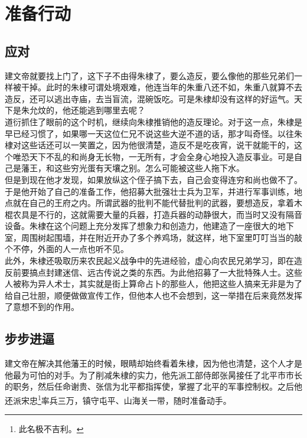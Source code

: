 \section{准备行动}
\ifnum{}
	\begin{multicols}{\theparacolNo}
\fi
\subsection{应对}
建文帝就要找上门了，这下子不由得朱棣了，要么造反，要么像他的那些兄弟们一样被干掉。此时的朱棣可谓处境艰难，他连当年的朱重八还不如，朱重八就算不去造反，还可以逃出寺庙，去当盲流，混碗饭吃。可是朱棣却没有这样的好运气。天下是朱允炆的，他还能逃到哪里去呢？\\

道衍抓住了眼前的这个时机，继续向朱棣推销他的造反理论。对于这一点，朱棣是早已经习惯了，如果哪一天这位仁兄不说这些大逆不道的话，那才叫奇怪。以往朱棣对这些话还可以一笑置之，因为他很清楚，造反不是吃夜宵，说干就能干的，这个唯恐天下不乱的和尚身无长物，一无所有，才会全身心地投入造反事业。可是自己是藩王，和这些穷光蛋有天壤之别。怎么可能被这些人拖下水。\\

但是到现在他才发现，如果放纵这个侄子搞下去，自己会变得连穷和尚也做不了。\\

于是他开始了自己的准备工作，他招募大批强壮士兵为卫军，并进行军事训练，地点就在自己的王府之内。所谓武器的批判不能代替批判的武器，要想造反，拿着木棍农具是不行的，这就需要大量的兵器，打造兵器的动静很大，而当时又没有隔音设备。朱棣在这个问题上充分发挥了想象力和创造力，他建造了一座很大的地下室，周围树起围墙，并在附近开办了多个养鸡场，就这样，地下室里叮叮当当的敲个不停，外面的人一点也听不见。\\

此外，朱棣还吸取历来农民起义战争中的先进经验，虚心向农民兄弟学习，即在造反前要搞点封建迷信、远古传说之类的东西。为此他招募了一大批特殊人士。这些人被称为异人术士，其实就是街上算命占卜的那些人，他把这些人搞来无非是为了给自己壮胆，顺便做做宣传工作，但他本人也不会想到，这一举措在后来竟然发挥了意想不到的作用。\\

\subsection{步步进逼}
建文帝在解决其他藩王的时候，眼睛却始终看着朱棣，因为他也清楚，这个人才是他最为可怕的对手。为了削减朱棣的实力，他先派工部侍郎张昺接任了北平市市长的职务，然后任命谢贵、张信为北平都指挥使，掌握了北平的军事控制权。之后他还派宋忠\footnote{此名极不吉利。}率兵三万，镇守屯平、山海关一带，随时准备动手。\\


\end{multicols}
